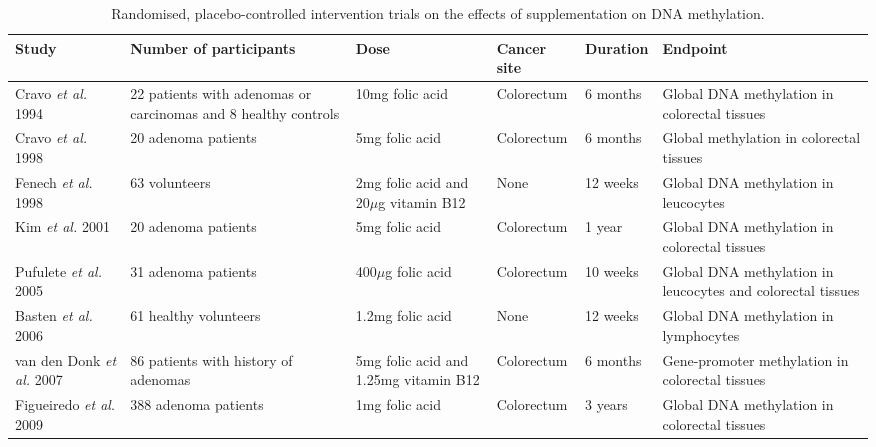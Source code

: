 \begin{sidewaystable}[h]
\footnotesize
\caption{Randomised, placebo-controlled intervention trials on the effects of supplementation on DNA methylation.} 
\label{table2_1} 
  \begin{adjustbox}{width=18cm}
  \renewcommand{\arraystretch}{2.0}
  \begin{tabular}{L{2cm}C{3cm}C{3cm}C{2cm}C{2cm}C{4cm}}
  \hline 
  \bfseries Study & \bfseries Number of participants & \bfseries Dose & \bfseries Cancer site & \bfseries Duration & \bfseries Endpoint\\
  \hline 
  Cravo \textit{et al.} 1994 \cite{c253} &  22 patients with adenomas or carcinomas and 8 healthy controls &  10mg folic acid & Colorectum & 6 months &  Global DNA methylation in colorectal tissues\\
  Cravo \textit{et al.} 1998 \cite{c254} &  20 adenoma patients &  5mg folic acid &  Colorectum &  6 months &  Global methylation in colorectal tissues\\
  Fenech \textit{et al.} 1998 \cite{c252} &  63 volunteers &  2mg folic acid and 20\textrm{${\mu}$}g vitamin B12 &  None &  12 weeks &  Global DNA methylation in leucocytes\\
  Kim \textit{et al.} 2001 \cite{c255} &  20 adenoma patients &  5mg folic acid &  Colorectum &  1 year &  Global DNA methylation in colorectal tissues\\
  Pufulete \textit{et al.} 2005 \cite{c256} &  31 adenoma patients &  400\textrm{${\mu}$}g folic acid &  Colorectum &  10 weeks &  Global DNA methylation in leucocytes and colorectal tissues \\
  Basten \textit{et al.} 2006 \cite{c251} &  61 healthy volunteers &  1.2mg folic acid &  None &  12 weeks &  Global DNA methylation in lymphocytes\\
  van den Donk \textit{et al.} 2007 \cite{c258} &  86 patients with history of adenomas &  5mg folic acid and 1.25mg vitamin B12 &  Colorectum &  6 months &  Gene-promoter methylation in colorectal tissues \\
  Figueiredo \textit{et al}. 2009 \cite{c257} &  388 adenoma patients &  1mg folic acid &  Colorectum &  3 years &  Global DNA methylation in colorectal tissues\\
  \hline
  \end{tabular}
  \end{adjustbox}
\end{sidewaystable}

